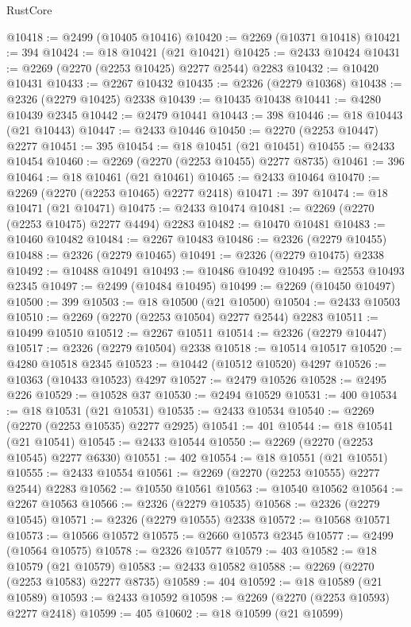 \begin{lexlean}{RustCore}
\begin{coremodule}
@10418 := @2499 (@10405 @10416)
@10420 := @2269 (@10371 @10418)
@10421 := 394
@10424 := @18 @10421 (@21 @10421)
@10425 := @2433 @10424
@10431 := @2269 (@2270 (@2253 @10425) @2277 @2544) @2283
@10432 := @10420 @10431
@10433 := @2267 @10432
@10435 := @2326 (@2279 @10368)
@10438 := @2326 (@2279 @10425) @2338
@10439 := @10435 @10438
@10441 := @4280 @10439 @2345
@10442 := @2479 @10441
@10443 := 398
@10446 := @18 @10443 (@21 @10443)
@10447 := @2433 @10446
@10450 := @2270 (@2253 @10447) @2277
@10451 := 395
@10454 := @18 @10451 (@21 @10451)
@10455 := @2433 @10454
@10460 := @2269 (@2270 (@2253 @10455) @2277 @8735)
@10461 := 396
@10464 := @18 @10461 (@21 @10461)
@10465 := @2433 @10464
@10470 := @2269 (@2270 (@2253 @10465) @2277 @2418)
@10471 := 397
@10474 := @18 @10471 (@21 @10471)
@10475 := @2433 @10474
@10481 := @2269 (@2270 (@2253 @10475) @2277 @4494) @2283
@10482 := @10470 @10481
@10483 := @10460 @10482
@10484 := @2267 @10483
@10486 := @2326 (@2279 @10455)
@10488 := @2326 (@2279 @10465)
@10491 := @2326 (@2279 @10475) @2338
@10492 := @10488 @10491
@10493 := @10486 @10492
@10495 := @2553 @10493 @2345
@10497 := @2499 (@10484 @10495)
@10499 := @2269 (@10450 @10497)
@10500 := 399
@10503 := @18 @10500 (@21 @10500)
@10504 := @2433 @10503
@10510 := @2269 (@2270 (@2253 @10504) @2277 @2544) @2283
@10511 := @10499 @10510
@10512 := @2267 @10511
@10514 := @2326 (@2279 @10447)
@10517 := @2326 (@2279 @10504) @2338
@10518 := @10514 @10517
@10520 := @4280 @10518 @2345
@10523 := @10442 (@10512 @10520) @4297
@10526 := @10363 (@10433 @10523) @4297
@10527 := @2479 @10526
@10528 := @2495 @226
@10529 := @10528 @37
@10530 := @2494 @10529
@10531 := 400
@10534 := @18 @10531 (@21 @10531)
@10535 := @2433 @10534
@10540 := @2269 (@2270 (@2253 @10535) @2277 @2925)
@10541 := 401
@10544 := @18 @10541 (@21 @10541)
@10545 := @2433 @10544
@10550 := @2269 (@2270 (@2253 @10545) @2277 @6330)
@10551 := 402
@10554 := @18 @10551 (@21 @10551)
@10555 := @2433 @10554
@10561 := @2269 (@2270 (@2253 @10555) @2277 @2544) @2283
@10562 := @10550 @10561
@10563 := @10540 @10562
@10564 := @2267 @10563
@10566 := @2326 (@2279 @10535)
@10568 := @2326 (@2279 @10545)
@10571 := @2326 (@2279 @10555) @2338
@10572 := @10568 @10571
@10573 := @10566 @10572
@10575 := @2660 @10573 @2345
@10577 := @2499 (@10564 @10575)
@10578 := @2326 @10577
@10579 := 403
@10582 := @18 @10579 (@21 @10579)
@10583 := @2433 @10582
@10588 := @2269 (@2270 (@2253 @10583) @2277 @8735)
@10589 := 404
@10592 := @18 @10589 (@21 @10589)
@10593 := @2433 @10592
@10598 := @2269 (@2270 (@2253 @10593) @2277 @2418)
@10599 := 405
@10602 := @18 @10599 (@21 @10599)

\end{coremodule}
\end{lexlean}

